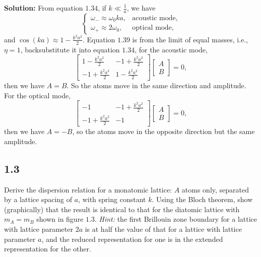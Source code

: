 \documentclass[12pt]{article}
\begin{document}
\textbf{Solution:}
From equation $1.34$, if $k \ll \frac{1}{a}$, we have
\begin{equation}
	\begin{cases}
		\omega_{-} \approx \omega_0 k a, & \text{acoustic mode}, \\
		\omega_{+} \approx 2 \omega_0,   & \text{optical mode},
	\end{cases}
\end{equation}
and $\cos (k a) \approx 1 - \frac{k^2 a^2}{2}$.
Equation $1.39$ is from the limit of equal masses, i.e., $\eta = 1$, backsubstitute it into equation $1.34$,
for the acoustic mode,
\begin{equation}
	\begin{bmatrix}
		1 - \frac{k^2 a^2}{2}  & -1 + \frac{k^2 a^2}{2} \\
		-1 + \frac{k^2 a^2}{2} & 1 - \frac{k^2 a^2}{2}
	\end{bmatrix}
	\begin{bmatrix}
		A \\
		B
	\end{bmatrix} = 0,
\end{equation}
then we have $A = B$. So the atoms move in the same direction and amplitude.
For the optical mode,
\begin{equation}
	\begin{bmatrix}
		-1                     & -1 + \frac{k^2 a^2}{2} \\
		-1 + \frac{k^2 a^2}{2} & -1
	\end{bmatrix}
	\begin{bmatrix}
		A \\
		B
	\end{bmatrix} = 0,
\end{equation}
then we have $A = -B$, so the atoms move in the opposite direction but the same amplitude.

\subsection{1.3}

Derive the dispersion relation for a monatomic lattice: $A$ atoms only,
separated by a lattice spacing of $a$, with spring constant $k$.
Using the Bloch theorem, show (graphically) that the result is
identical to that for the diatomic lattice with $m_A = m_B$ shown in figure $1.3$.
\textit{Hint:} the first Brillouin zone boundary for a lattice with lattice parameter
$2a$ is at half the value of that for a lattice with lattice parameter $a$,
and the reduced representation for one is in the extended representation for the other.
\end{document}
